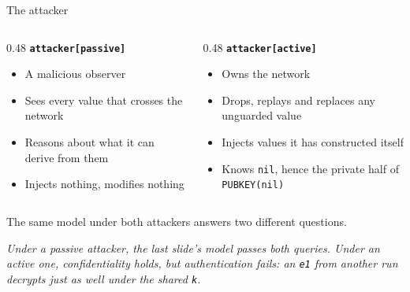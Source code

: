 \ifdefined\PRESENTATION\else\PassOptionsToClass{handout}{beamer}\fi\documentclass[aspectratio=169, lualatex]{beamer}
\begin{document}
\begin{frame}{The attacker}
	\begin{columns}[t]
		\begin{column}{0.48\textwidth}
			\textbf{\texttt{attacker[passive]}}
			\begin{itemize}
				\item A malicious observer
				\item Sees every value that crosses the network
				\item Reasons about what it can derive from them
				\item Injects nothing, modifies nothing
			\end{itemize}
		\end{column}
		\begin{column}{0.48\textwidth}
			\textbf{\texttt{attacker[active]}}
			\begin{itemize}
				\item Owns the network
				\item Drops, replays and replaces any unguarded value
				\item Injects values it has constructed itself
				\item Knows \texttt{nil}, hence the private half of \texttt{PUBKEY(nil)}
			\end{itemize}
		\end{column}
	\end{columns}
	\vspace{0.4em}
	\begin{center}
		The same model under both attackers answers two different questions.

		\vspace{0.1em}

		\textit{Under a passive attacker, the last slide's model passes both queries. Under an active one, confidentiality holds, but authentication fails: an \texttt{e1} from another run decrypts just as well under the shared \texttt{k}.}
	\end{center}
\end{frame}
\end{document}

